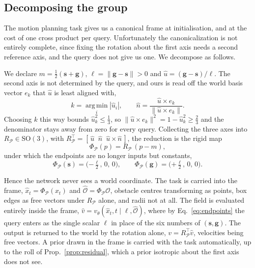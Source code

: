 \documentclass[conference]{IEEEtran}
\newcommand{\svec}{\mathbf{s}}
\newcommand{\gvec}{\mathbf{g}}
\begin{document}
\subsection{Decomposing the group}
\label{sec:decompose}

The motion planning task gives us a canonical frame at initialisation, and at the cost of one cross product per query. Unfortunately the canonicalization is not entirely complete, since fixing
the rotation about the first axis needs a second reference axis, and the query
does not give us one. We decompose as follows.

We declare $m = \tfrac{1}{2}(\svec + \gvec)$, $\ell = \|\gvec - \svec\| > 0$
and $\hat{u} = (\gvec - \svec)/\ell$. The second axis is not determined by the
query, and ours is read off the world basis vector $e_k$ that $\hat{u}$ is least
aligned with,
\begin{equation}
  k = \operatorname*{arg\,min}_{i} |\hat{u}_i| ,
  \qquad
  \hat{n} = \frac{\hat{u} \times e_k}{\|\hat{u} \times e_k\|} .
  \label{eq:second-axis}
\end{equation}
Choosing $k$ this way bounds $\hat{u}_k^2 \le \tfrac{1}{3}$, so
$\|\hat{u} \times e_k\|^2 = 1 - \hat{u}_k^2 \ge \tfrac{2}{3}$ and the denominator
stays away from zero for every query. Collecting the three axes into
$R_{\mathcal{P}} \in \mathrm{SO}(3)$, with
$R_{\mathcal{P}}^{\top} = [\,\hat{u}\;\; \hat{n}\;\; \hat{u} \times \hat{n}\,]$,
the reduction is the rigid map
\begin{equation}
  \Phi_{\mathcal{P}}(p) = R_{\mathcal{P}}\,(p - m),
  \label{eq:reduction}
\end{equation}
under which the endpoints are no longer inputs but constants,
\begin{equation}
  \Phi_{\mathcal{P}}(\svec) = \big({-\tfrac{\ell}{2}},\, 0,\, 0\big),
  \qquad
  \Phi_{\mathcal{P}}(\gvec) = \big({+\tfrac{\ell}{2}},\, 0,\, 0\big).
  \label{eq:endpoints}
\end{equation}

Hence the network never sees a world coordinate. The task is carried into the
frame, $\hat{x}_t = \Phi_{\mathcal{P}}(x_t)$ and
$\hat{\mathcal{O}} = \Phi_{\mathcal{P}}\mathcal{O}$, obstacle centres transforming
as points, box edges as free vectors under $R_{\mathcal{P}}$ alone, and radii not
at all. The field is evaluated entirely inside the frame,
$\hat{v} = v_\theta(\hat{x}_t, t \mid \ell, \hat{\mathcal{O}})$, where by
Eq.~\eqref{eq:endpoints} the query enters as the single scalar $\ell$ in place of
the six numbers of $(\svec, \gvec)$. The output is returned to the world by the
rotation alone, $v = R_{\mathcal{P}}^{\top}\hat{v}$, velocities being free
vectors. A prior drawn in the frame is carried with the task automatically, up to
the roll of Prop.~\ref{prop:residual}, which a prior isotropic about the first
axis does not see.
\end{document}
